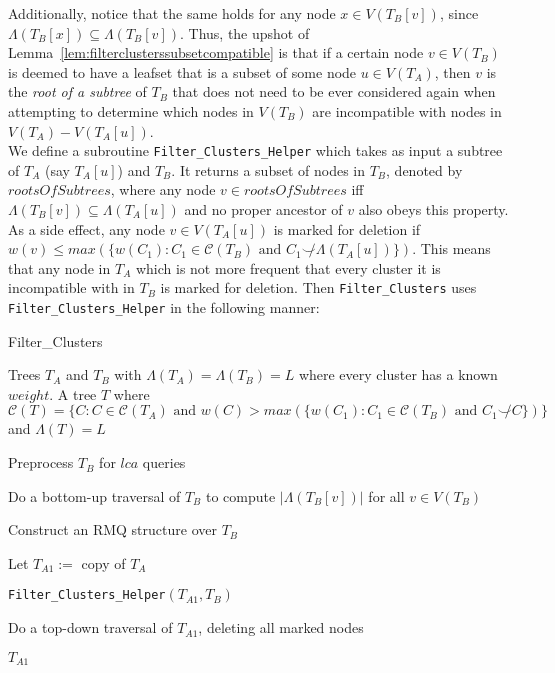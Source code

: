 \documentclass{article}
\newcommand{\compatible}{\smile}
\newcommand{\leafset}{\Lambda}
\begin{document}
    Additionally, notice that the same holds for any node $x \in V(T_B[v])$, since $\leafset(T_B[x]) \subseteq \leafset(T_B[v])$. Thus, the upshot of Lemma~\ref{lem:filterclusterssubsetcompatible} is that if a certain node $v \in V(T_B)$ is deemed to have a leafset that is a subset of some node $u \in V(T_A)$, then $v$ is the \textit{root of a subtree} of $T_B$ that does not need to be ever considered again when attempting to determine which nodes in $V(T_B)$ are incompatible with nodes in $V(T_A) - V(T_A[u])$.\\

    We define a subroutine \texttt{Filter\_Clusters\_Helper} which takes as input a subtree of $T_A$ (say $T_A[u]$) and $T_B$. It returns a subset of nodes in $T_B$, denoted by $rootsOfSubtrees$, where any node $v \in rootsOfSubtrees$ iff $\leafset(T_B[v]) \subseteq \leafset(T_A[u])$ and no proper ancestor of $v$ also obeys this property. As a side effect, any node $v \in V(T_A[u])$ is marked for deletion if $w(v) \leq max(\{w(C_1) : C_1 \in \mathcal{C}(T_B) \text{ and } C_1 \not\compatible \leafset(T_A[u])\})$. This means that any node in $T_A$ which is not more frequent that every cluster it is incompatible with in $T_B$ is marked for deletion. Then \texttt{Filter\_Clusters} uses \texttt{Filter\_Clusters\_Helper} in the following manner:

    \begin{algorithm}
        \caption{Filter\_Clusters}
        \begin{algorithmic}[1]
            \Input Trees $T_A$ and $T_B$ with $\leafset(T_A) = \leafset(T_B) = L$ where every cluster has a known $weight$.
            \Output A tree $T$ where $\mathcal{C}(T) = \{C : C \in \mathcal{C}(T_A) \text{ and } w(C) > max(\{w(C_1) : C_1 \in \mathcal{C}(T_B) \text{ and } C_1 \not\compatible C\})\}$ and $\leafset(T) = L$

            \State Preprocess $T_B$ for $lca$ queries

            \State Do a bottom-up traversal of $T_B$ to compute $|\leafset(T_B[v])|$ for all $v \in V(T_B)$

            \State Construct an RMQ structure over $T_B$

            \State Let $T_{A1} :=$ copy of $T_A$

            \State \texttt{Filter\_Clusters\_Helper}$(T_{A1}, T_B)$

            \State Do a top-down traversal of $T_{A1}$, deleting all marked nodes

            \State \Return $T_{A1}$
        \end{algorithmic}
    \end{algorithm}
\end{document}

